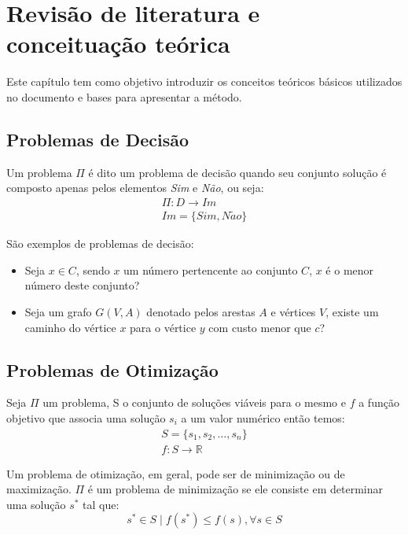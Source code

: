 \chapter{Revisão de literatura e conceituação teórica} \label{cap:conceitos}

Este capítulo tem como objetivo introduzir os conceitos teóricos básicos utilizados no documento e bases para apresentar a método.

\section{Problemas de Decisão} \label{sec:problemaDecisao}

Um problema $\Pi$ é dito um problema de decisão quando seu conjunto solução é composto apenas pelos elementos \textit{Sim} e \textit{Não}, ou seja:
\begin{equation} \label{eq:problemaDecisao}
\begin{split}
\Pi: D \rightarrow Im  \\
Im = \{ Sim, N\widetilde{a}o \}
\end{split}
\end{equation}

São exemplos de problemas de decisão:
\begin{itemize}
    \item{Seja $x \in C$, sendo $x$ um número pertencente ao conjunto $C$, $x$ é o menor número deste conjunto?}
    \item{Seja um grafo $G(V,A)$ denotado pelos arestas $A$ e vértices $V$, existe um caminho do vértice $x$ para o vértice $y$ com custo menor que $c$?}
\end{itemize}

\section{Problemas de Otimização} \label{sec:problemaOtimizacao}

Seja $\Pi$ um problema, S o conjunto de soluções viáveis para o mesmo e $f$ a função objetivo que associa uma solução $s_i$ a um valor numérico então temos:
\begin{equation}  \label{eq:problemaOtimizacao}
\begin{split}
S = \{s_1, s_2, \dots, s_n \} \\
f: S \rightarrow \mathbb{R}
\end{split}
\end{equation}

Um problema de otimização, em geral, pode ser de minimização ou de maximização.
$\Pi$ é um problema de minimização se ele consiste em determinar uma solução $s^*$ tal que:
\begin{equation}  \label{eq:problemaOtimizacaoMinimizar}
s^* \in S \mid f(s^*) \leq f(s), \forall s \in S
\end{equation}

